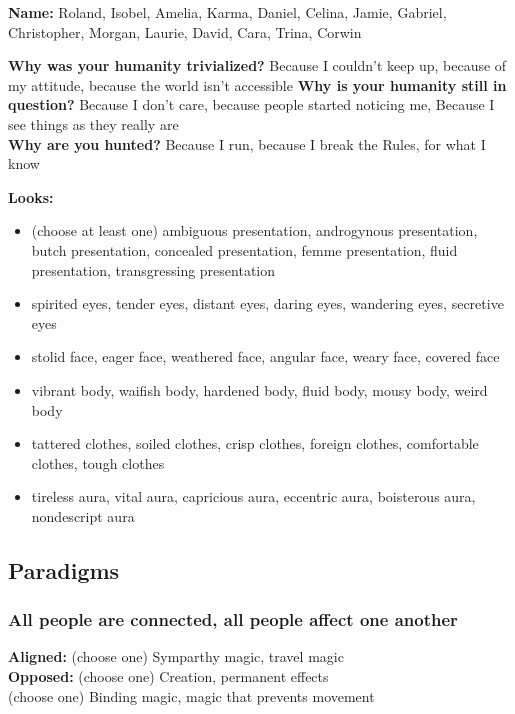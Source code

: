 \documentclass[
]{memoir}
\begin{document}
\textbf{Name:} Roland, Isobel, Amelia, Karma, Daniel, Celina, Jamie,
Gabriel, Christopher, Morgan, Laurie, David, Cara, Trina, Corwin

\textbf{Why was your humanity trivialized?} Because I couldn't keep up,
because of my attitude, because the world isn't accessible \textbf{Why
is your humanity still in question?} Because I don't care, because
people started noticing me, Because I see things as they really are\\
\textbf{Why are you hunted?} Because I run, because I break the Rules,
for what I know

\textbf{Looks:}

\begin{itemize}
\tightlist
\item
  (choose at least one) ambiguous presentation, androgynous
  presentation, butch presentation, concealed presentation, femme
  presentation, fluid presentation, transgressing presentation
\item
  spirited eyes, tender eyes, distant eyes, daring eyes, wandering eyes,
  secretive eyes
\item
  stolid face, eager face, weathered face, angular face, weary face,
  covered face
\item
  vibrant body, waifish body, hardened body, fluid body, mousy body,
  weird body
\item
  tattered clothes, soiled clothes, crisp clothes, foreign clothes,
  comfortable clothes, tough clothes
\item
  tireless aura, vital aura, capricious aura, eccentric aura, boisterous
  aura, nondescript aura
\end{itemize}

\hypertarget{paradigms-8}{%
\subsection{Paradigms}\label{paradigms-8}}

\hypertarget{all-people-are-connected-all-people-affect-one-another}{%
\subsubsection{All people are connected, all people affect one
another}\label{all-people-are-connected-all-people-affect-one-another}}

\textbf{Aligned:} (choose one) Symparthy magic, travel magic\\
\textbf{Opposed:} (choose one) Creation, permanent effects\\
(choose one) Binding magic, magic that prevents movement
\end{document}
